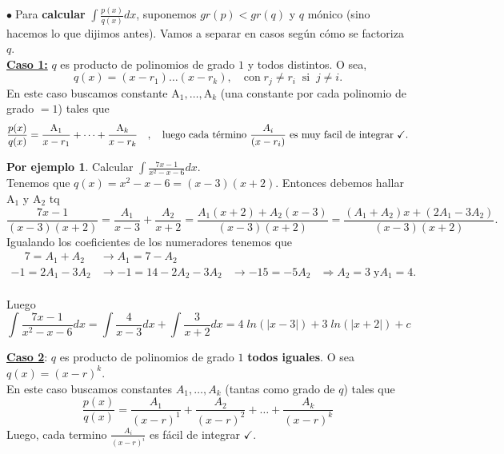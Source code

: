 \documentclass{article}
\theoremstyle{definition}
\theoremstyle{definition}
\newtheorem*{ej}{Por ejemplo}
\theoremstyle{remark}
\newcommand\bl{$\bullet\;$}
\newcommand\ok{\checkmark}
\begin{document}
\bl Para \textbf{calcular} $\int{\frac{p(x)}{q(x)}dx}$, suponemos $gr(p)<gr(q)$ y $q$ mónico (sino hacemos lo que dijimos antes). Vamos a separar en casos según cómo se factoriza $q$. \\

\underline{\textbf{Caso 1:}} $q$ es producto de polinomios de grado $1$ y todos distintos. O sea, \[
q(x)=(x-r_1)\dots(x-r_k),\quad \text{con} \; r_j \neq r_i \; \; \text{si} \; \; j \neq i.\]
En este caso buscamos constante $\text{A}_1, \dots , \text{A}_k$ (una constante por cada polinomio de grado $=1$) tales que \[
\frac{p(x)}{q(x)}=\frac{\text{A}_1}{x-r_1}+ \dots + \frac{\text{A}_k}{x-r_k} \quad,\quad \text{luego cada término $\frac{A_i}{(x-r_i)}$ es muy facil de integrar \ok}.
\]

\begin{ej}
  Calcular $\int{\frac{7x-1}{x^2-x-6}dx}$.\\
  Tenemos que $q(x)=x^2-x-6=(x-3)(x+2).$ Entonces debemos hallar A$_1$ y A$_2$ tq \[
\frac{7x-1}{(x-3)(x+2)}
=
\frac{A_1}{x-3}+\frac{A_2}{x+2}
=
\frac{A_1(x+2)+A_2(x-3)}{(x-3)(x+2)}
=
\frac{(A_1+A_2)x+(2A_1-3A_2)}{(x-3)(x+2)}.
  \]
  Igualando los coeficientes de los numeradores tenemos que\\
  $\begin{array}{llll}
\phantom{-}7=A_1+A_2 & \longrightarrow A_1=7-A_2 & & \\
-1=2A_1-3A_2 & \longrightarrow -1=14-2A_2-3A_2 & \longrightarrow -15 =-5A_2 & \Longrightarrow A_2=3 \; \text{y} A_1 = 4.
  \end{array}$\\\\
Luego
$$\int{\frac{7x-1}{x^2-x-6}dx}
=
\int{\frac{4}{x-3}dx}+\int{\frac{3}{x+2}dx}=4\; ln(|x-3|)+3\; ln (|x+2|)+c$$
\end{ej}

\underline{\textbf{Caso 2}}: $q$ es producto de polinomios de grado $1$ \textbf{todos iguales}. O sea $q(x)=(x-r)^k$. \\
En este caso buscamos constantes $A_1 , \dots , A_k$ (tantas como grado de $q$) tales que \[
\frac{p(x)}{q(x)}
=
\frac{A_1}{(x-r)^1}+\frac{A_2}{(x-r)^2} + \dots + \frac{A_k}{(x-r)^k}
\]
Luego, cada termino $\frac{A_i}{(x-r)^i}$ es fácil de integrar $\ok$.
\end{document}
